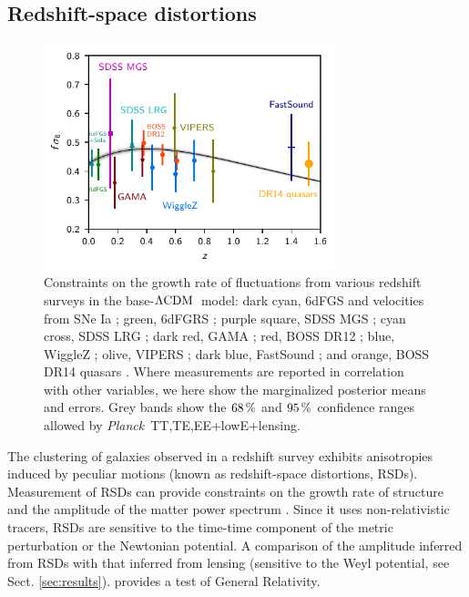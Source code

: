 \documentclass[longauth,traditabstract]{aa}
\def\Planck{\textit{Planck}}
\def\,{\thinspace}
\newcommand{\mksym}[1]{\ifmmode {\rm #1}\else #1\fi}
\newcommand{\dataplus}{\allowbreak+}
\newcommand{\lensing}{\mksym{lensing}}
\newcommand{\TTTEEE}{\mksym{TT,TE,EE}}
\newcommand{\planckTTTEEEonly}{\planck\ \TTTEEE}
\newcommand{\lowE}{\mksym{lowE}}
\newcommand{\planckall}{\planckTTTEEEonly\dataplus\lowE}
\newcommand{\planckalllensing}{\planckall\dataplus\lensing}
\providecommand{\LCDM}{{$\rm{\Lambda CDM}$}}
\newcommand{\planck}{\Planck}
\begin{document}
\subsection{Redshift-space distortions}\label{sec:RSD}
\begin{figure}
\begin{center}
\includegraphics[width=85mm,angle=0]{fsig8-z__lensing.pdf}
\end{center}
\caption {
Constraints on the growth rate of fluctuations from various redshift
surveys in the base-\LCDM\ model:
dark cyan, 6dFGS and velocities from SNe Ia \citep{Huterer:2016uyq};
green, 6dFGRS \citep{Beutler:2012px};
purple square, SDSS MGS \citep{Howlett:2014opa};
cyan cross, SDSS LRG \citep{Oka:2013cba};
dark red, GAMA \citep{Blake:2013nif};
red, BOSS DR12 \citep{Alam:2016hwk};
blue, WiggleZ \citep{Blake:2012pj};
olive, VIPERS \citep{Pezzotta:2016gbo};
dark blue, FastSound \citep{Okumura:2015lvp};
and orange, BOSS DR14 quasars \citep{Zarrouk:2018vwy}.
Where measurements are reported in correlation with other variables, we here show the marginalized posterior means and errors.
Grey bands show the $68\,\%$ and $95\,\%$ confidence ranges allowed by \planckalllensing.
 }
\label{fig:RSD}
\end{figure}


The clustering of galaxies observed in a redshift survey exhibits anisotropies
induced by peculiar motions (known as redshift-space distortions, RSDs).
Measurement of RSDs can provide constraints on the growth rate of structure and
the amplitude of the matter power spectrum \citep[e.g.,][]{PerWhi09}.
Since it uses non-relativistic tracers, RSDs are sensitive to the time-time
component of the metric perturbation or the Newtonian potential.
A comparison of the amplitude inferred from RSDs with that inferred from
lensing (sensitive to the Weyl potential, see Sect. \ref{sec:results}).
provides a test of General
Relativity.
\end{document}
